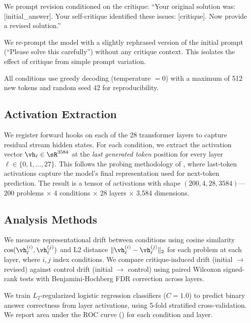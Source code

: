  We prompt revision conditioned on the critique: ``Your original solution was: [initial\_answer]. Your self-critique identified these issues: [critique]. Now provide a revised solution.''

 We re-prompt the model with a slightly rephrased version of the initial prompt (``Please solve this carefully'') without any critique context. This isolates the effect of critique from simple prompt variation.

All conditions use greedy decoding (temperature $= 0$) with a maximum of 512 new tokens and random seed 42 for reproducibility.

\subsection{Activation Extraction}
\label{sec:method:activations}

We register forward hooks on each of the 28 transformer layers to capture residual stream hidden states. For each condition, we extract the activation vector $\vh_\ell \in \sR^{3584}$ at the \emph{last generated token} position for every layer $\ell \in \{0, 1, \ldots, 27\}$. This follows the probing methodology of \citet{marks2024geometry}, where last-token activations capture the model's final representation used for next-token prediction. The result is a tensor of activations with shape $(200, 4, 28, 3584)$---200 problems $\times$ 4 conditions $\times$ 28 layers $\times$ 3,584 dimensions.

\subsection{Analysis Methods}
\label{sec:method:analysis}

 We measure representational drift between conditions using cosine similarity $\cossim(\vh_\ell^{(i)}, \vh_\ell^{(j)})$ and L2 distance $\|\vh_\ell^{(i)} - \vh_\ell^{(j)}\|_2$ for each problem at each layer, where $i, j$ index conditions. We compare critique-induced drift (initial $\to$ revised) against control drift (initial $\to$ control) using paired Wilcoxon signed-rank tests with Benjamini-Hochberg FDR correction across layers.

 We train $L_2$-regularized logistic regression classifiers ($C = 1.0$) to predict binary answer correctness from layer activations, using 5-fold stratified cross-validation. We report area under the ROC curve (\auc) for each condition and layer.

